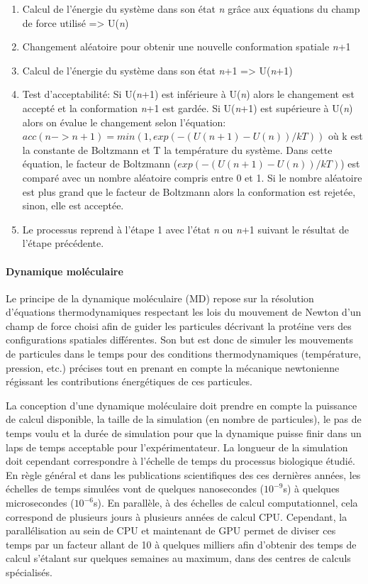 \begin{enumerate}
	\item Calcul de l'énergie du système dans son état \textit{n} grâce aux équations du champ de force utilisé => U(\textit{n})
	\item Changement aléatoire pour obtenir une nouvelle conformation spatiale \textit{n}+1
	\item Calcul de l'énergie du système dans son état \textit{n}+1 => U(\textit{n}+1)
	\item Test d'acceptabilité: 
	Si U(\textit{n}+1) est inférieure à U(\textit{n}) alors le changement est accepté et la conformation \textit{n}+1 est gardée. 
	Si U(\textit{n}+1) est supérieure à U(\textit{n}) alors on évalue le changement selon l'équation: $acc(n -> n+1) = min(1, exp(-(U(n+1)-U(n))/kT))$ où k est la constante de Boltzmann et T la température du système. Dans cette équation, le facteur de Boltzmann ($exp(-(U(n+1)-U(n))/kT)$) est comparé avec un nombre aléatoire compris entre 0 et 1. Si le nombre aléatoire est plus grand que le facteur de Boltzmann alors la conformation est rejetée, sinon, elle est acceptée.
	\item Le processus reprend à l'étape 1 avec l'état \textit{n} ou \textit{n}+1 suivant le résultat de l'étape précédente.
\end{enumerate}

\paragraph{Dynamique moléculaire}

Le principe de la dynamique moléculaire (MD) repose sur la résolution d'équations thermodynamiques respectant les lois du mouvement de Newton d'un champ de force choisi afin de guider les particules décrivant la protéine vers des configurations spatiales différentes. Son but est donc de simuler les mouvements de particules dans le temps pour des conditions thermodynamiques (température, pression, etc.) précises tout en prenant en compte la mécanique newtonienne régissant les contributions énergétiques de ces particules.

La conception d'une dynamique moléculaire doit prendre en compte la puissance de calcul disponible, la taille de la simulation (en nombre de particules), le pas de temps voulu et la durée de simulation pour que la dynamique puisse finir dans un laps de temps acceptable pour l'expérimentateur. La longueur de la simulation doit cependant correspondre à l'échelle de temps du processus biologique étudié. En règle général et dans les publications scientifiques des ces dernières années, les échelles de temps simulées vont de quelques nanosecondes ($10^{-9}$s) à quelques microsecondes ($10^{-6}$s). En parallèle, à des échelles de calcul computationnel, cela correspond de plusieurs jours à plusieurs années de calcul CPU. Cependant, la parallélisation au sein de CPU et maintenant de GPU permet de diviser ces temps par un facteur allant de 10 à quelques milliers afin d'obtenir des temps de calcul s'étalant sur quelques semaines au maximum, dans des centres de calculs spécialisés.

